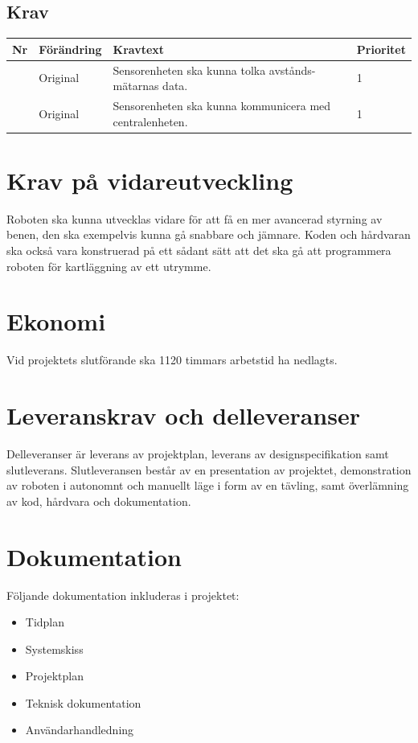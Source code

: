 \documentclass[a4paper,titlepage,12pt]{article}
\newcounter{reqNr}
\newcommand{\nextReqNr}{\stepcounter{reqNr}\arabic{reqNr}}
\begin{document}
	\subsection{Krav}
	\begin{table}[h]
		\label{tab:label}
		\begin{tabularx}{\textwidth}{|c|l|X|l|}
			\hline
			\textbf{Nr} & \textbf{Förändring} & \textbf{Kravtext} & \textbf{Prioritet} 
				\\ \hline

			\nextReqNr & Original & Sensorenheten ska kunna tolka avstånds- mätarnas data. & 1
				\\ \hline

			\nextReqNr & Original & Sensorenheten ska kunna kommunicera med 
				centralenheten. & 1
				\\ \hline

		\end{tabularx}
	\end{table}


	\section{Krav på vidareutveckling}
	Roboten ska kunna utvecklas vidare för att få en mer avancerad styrning av benen, 
	den ska exempelvis kunna gå snabbare och jämnare. Koden och hårdvaran ska också vara
	konstruerad på ett sådant sätt att det ska gå att programmera roboten för
	kartläggning av ett utrymme.

	\section{Ekonomi}
	Vid projektets slutförande ska 1120 timmars arbetstid ha nedlagts.

	\section{Leveranskrav och delleveranser}
	Delleveranser är leverans av projektplan, leverans av designspecifikation 
	samt slutleverans. Slutleveransen består av en presentation av projektet, 
	demonstration av roboten i autonomnt och manuellt läge i form av en tävling,
	samt överlämning av kod, hårdvara och dokumentation.
	
	\section{Dokumentation}
    Följande dokumentation inkluderas i projektet:
    \begin{itemize}
		\item Tidplan 
		\item Systemskiss 
		\item Projektplan
		\item Teknisk dokumentation 
		\item Användarhandledning 
    \end{itemize}
\end{document}
